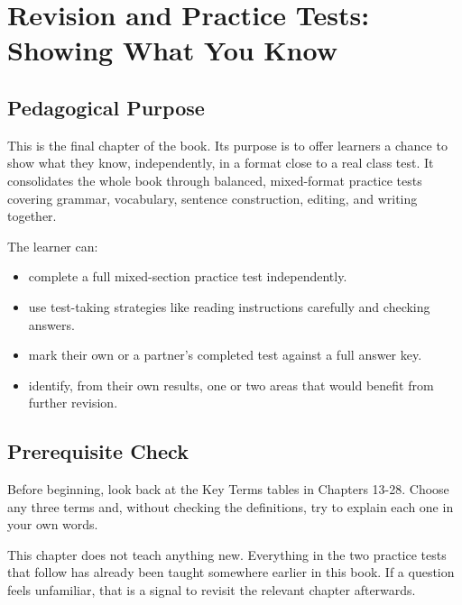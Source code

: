 
\chapter{Revision and Practice Tests: Showing What You Know}

\section{Pedagogical Purpose}
This is the final chapter of the book. Its purpose is to offer learners a chance to show what they know, independently, in a format close to a real class test. It consolidates the whole book through balanced, mixed-format practice tests covering grammar, vocabulary, sentence construction, editing, and writing together.

\begin{learningobjectives}
The learner can:
\begin{itemize}
    \item complete a full mixed-section practice test independently.
    \item use test-taking strategies like reading instructions carefully and checking answers.
    \item mark their own or a partner's completed test against a full answer key.
    \item identify, from their own results, one or two areas that would benefit from further revision.
\end{itemize}
\end{learningobjectives}

\section{Prerequisite Check}
\begin{quickcheck}
Before beginning, look back at the Key Terms tables in Chapters 13-28. Choose any three terms and, without checking the definitions, try to explain each one in your own words.
\end{quickcheck}

\begin{rememberbox}
This chapter does not teach anything new. Everything in the two practice tests that follow has already been taught somewhere earlier in this book. If a question feels unfamiliar, that is a signal to revisit the relevant chapter afterwards.
\end{rememberbox}

